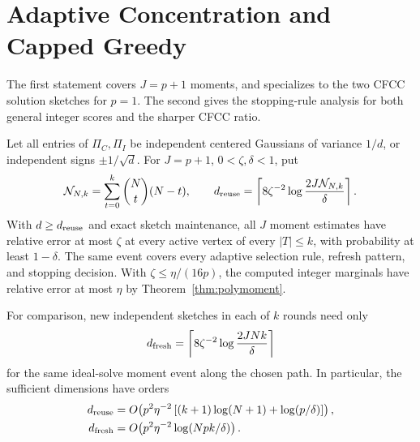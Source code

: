 \section{Adaptive Concentration and Capped Greedy}\label{app:adaptive}

The first statement covers $J=p+1$ moments, and specializes to the
two CFCC solution sketches for $p=1$. The second gives the stopping-rule
analysis for both general integer scores and the sharper CFCC ratio.
\begin{theorem}
\label{thm:adaptivehybridjl}
Let all entries of $\Pi_C,\Pi_I$ be independent centered Gaussians of
variance $1/d$, or independent signs $\pm1/\sqrt d$.
For $J=p+1$, $0<\zeta,\delta<1$, put
\[
 \mathcal N_{N,k}=\sum_{t=0}^k\binom Nt(N-t),\qquad
 d_{\rm reuse}=\left\lceil
    8\zeta^{-2}\log\frac{2J\mathcal N_{N,k}}{\delta}\right\rceil.
\]
With $d\geq d_{\rm reuse}$ and exact sketch maintenance,
all $J$ moment estimates have relative error at most $\zeta$
at every active vertex of every $|T|\leq k$, with probability
at least $1-\delta$. The same event covers every adaptive
selection rule, refresh pattern, and stopping decision.
With $\zeta\leq\eta/(16p)$, the computed integer marginals
have relative error at most $\eta$ by
Theorem~\ref{thm:polymoment}.

For comparison, new independent sketches in each of $k$ rounds
need only
\[
 d_{\rm fresh}=\left\lceil
       8\zeta^{-2}\log\frac{2JNk}{\delta}\right\rceil
\]
for the same ideal-solve moment event along the chosen path.
In particular, the sufficient dimensions have orders
\begin{align*}
 d_{\rm reuse}
 &=O\!\left(p^2\eta^{-2}
       \left[(k+1)\log(N+1)+\log(p/\delta)\right]\right),\\
 d_{\rm fresh}
 &=O\!\left(p^2\eta^{-2}\log(Npk/\delta)\right).
\end{align*}
\end{theorem}
